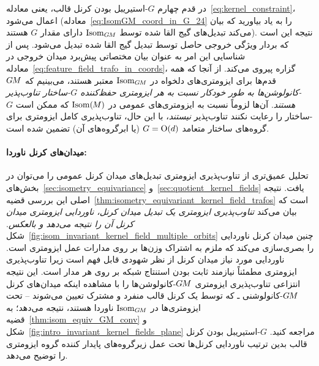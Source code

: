 در قدم چهارم $G$-استیریبل بودن کرنل قالب، یعنی معادله~\eqref{eq:kernel_constraint}، اعمال می‌شود (معادله~\eqref{eq:IsomGM_coord_in_G_24} را به یاد بیاورید که بیان می‌کند تبدیل‌های گیج القا شده توسط $\operatorname{Isom}_{G\mkern-1.4muM}$ دارای مقدار $G$ هستند).
نتیجه این است که بردار ویژگی خروجی حاصل توسط تبدیل گیج القا شده تبدیل می‌شود.
پس از شناسایی این امر به عنوان بیان مختصاتی پیش‌برد میدان خروجی در معادله~\eqref{eq:feature_field_trafo_in_coords}، گزاره پیروی می‌کند.
از آنجا که همه قدم‌ها برای ایزومتری‌های دلخواه در $\operatorname{Isom}_{G\mkern-1.4muM}$ معتبر هستند، می‌بینیم که \emph{$G\mkern-1.4muM$-کانولوشن‌ها به طور خودکار نسبت به هر ایزومتری حفظ‌کننده $G$-ساختار تناوب‌پذیر هستند}.
آن‌ها لزوماً نسبت به ایزومتری‌های عمومی در $\operatorname{Isom}(\mkern-1.5mu M \mkern-.5mu)$ که ممکن است $G$-ساختار را رعایت نکنند تناوب‌پذیر \emph{نیستند}، با این حال، تناوب‌پذیری کامل ایزومتری برای گروه‌های ساختار متعامد $G=\operatorname{O}(d)$ (یا ابرگروه‌های آن) تضمین شده است.



\paragraph{میدان‌های کرنل ناوردا:}
تحلیل عمیق‌تری از تناوب‌پذیری ایزومتری تبدیل‌های میدان کرنل عمومی را می‌توان در بخش‌های~\ref{sec:isometry_equivariance} و~\ref{sec:quotient_kernel_fields} یافت.
نتیجه اصلی این بررسی قضیه~\ref{thm:isometry_equivariant_kernel_field_trafos} است که بیان می‌کند \emph{تناوب‌پذیری ایزومتری یک تبدیل میدان کرنل، ناوردایی ایزومتری میدان کرنل آن را نتیجه می‌دهد و بالعکس}.
شکل~\ref{fig:isom_invariant_kernel_field_multiple_orbits} چنین میدان کرنل ناوردایی را بصری‌سازی می‌کند که ملزم به اشتراک وزن‌ها بر روی مدارات عمل ایزومتری است.
ناوردایی مورد نیاز میدان کرنل از نظر شهودی قابل فهم است زیرا تناوب‌پذیری ایزومتری مطمئناً نیازمند ثابت بودن استنتاج شبکه بر روی هر مدار است.
این نتیجه انتزاعی تناوب‌پذیری ایزومتری $G\mkern-1.4muM$-کانولوشن‌ها را با مشاهده اینکه میدان‌های کرنل $G\mkern-1.4muM$-کانولوشنی ـ که توسط یک کرنل قالب منفرد و مشترک تعیین می‌شوند -- تحت ایزومتری‌ها در $\operatorname{Isom}_{G\mkern-1.4muM}$ ناوردا هستند، نتیجه می‌دهد؛ به قضیه~\ref{thm:isom_equiv_GM_conv} و شکل~\ref{fig:intro_invariant_kernel_fields_plane} مراجعه کنید.
$G$-استیریبل بودن کرنل قالب بدین ترتیب ناوردایی کرنل‌ها تحت عمل زیرگروه‌های پایدار کننده گروه ایزومتری را توضیح می‌دهد.



